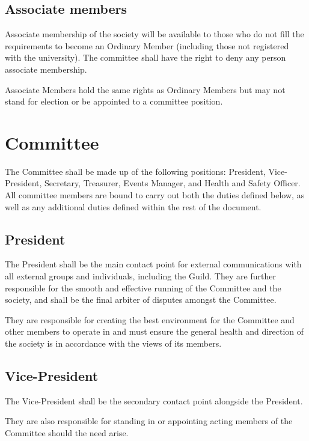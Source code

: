 \documentclass{report}
\begin{document}
	\subsection{Associate members}
	\label{member_associate}
	
	Associate membership of the society will be available to those who do not fill the requirements to become an Ordinary Member (including those not registered with the university). The committee shall have the right to deny any person associate membership.
	
	Associate Members hold the same rights as Ordinary Members but may not stand for election or be appointed to a committee position.
	
\newpage
\section{Committee}
\label{committee}

The Committee shall be made up of the following positions: President, Vice-President, Secretary, Treasurer, Events Manager, and Health and Safety Officer. All committee members are bound to carry out both the duties defined below, as well as any additional duties defined within the rest of the document.

	\subsection{President}

	The President shall be the main contact point for external communications with all external groups and individuals, including the Guild. They are further responsible for the smooth and effective running of the Committee and the society, and shall be the final arbiter of disputes amongst the Committee.
	
	They are responsible for creating the best environment for the Committee and other members to operate in and must ensure the general health and direction of the society is in accordance with the views of its members.
	
	\subsection{Vice-President}
	
	The Vice-President shall be the secondary contact point alongside the President.
	
	They are also responsible for standing in or appointing acting members of the Committee should the need arise.
	
\end{document}

